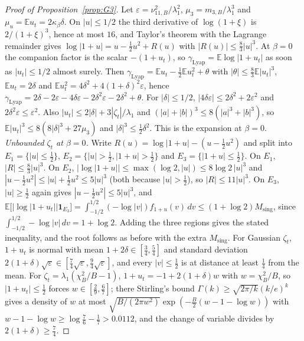 \documentclass[11pt]{article}
\theoremstyle{remark}
\newcommand{\E}{\mathbb{E}}
\begin{document}
\begin{proof}[Proof of Proposition~\ref{prop:G3}]
Let $\varepsilon=\nu_{11,B}^2/\lambda_1^2$, $\mu_3=m_{3,B}/\lambda_1^3$ and $\mu_u=\E u_t=2\kappa_\beta\delta$. On $|u|\le1/2$ the third derivative of $\log(1+\xi)$ is $2/(1+\xi)^3$, hence at most $16$, and Taylor's theorem with the Lagrange remainder gives $\log|1+u|=u-\frac12 u^2+R(u)$ with $|R(u)|\le\frac83|u|^3$. At $\beta=0$ the companion factor is the scalar $-(1+u_t)$, so $\gamma_{\mathrm{Lyap}}=\E\log|1+u_t|$ as soon as $|u_t|\le1/2$ almost surely. Then $\gamma_{\mathrm{Lyap}}=\E u_t-\frac12\E u_t^2+\theta$ with $|\theta|\le\frac83\E|u_t|^3$, $\E u_t=2\delta$ and $\E u_t^2=4\delta^2+4(1+\delta)^2\varepsilon$, hence $\gamma_{\mathrm{Lyap}}=2\delta-2\varepsilon-4\delta\varepsilon-2\delta^2\varepsilon-2\delta^2+\theta$. For $|\delta|\le1/2$, $|4\delta\varepsilon|\le2\delta^2+2\varepsilon^2$ and $2\delta^2\varepsilon\le\varepsilon^2$. Also $|u_t|\le2|\delta|+3|\zeta_t|/\lambda_1$ and $(|a|+|b|)^3\le8(|a|^3+|b|^3)$, so $\E|u_t|^3\le8(8|\delta|^3+27\mu_3)$ and $|\delta|^3\le\frac12\delta^2$. This is the expansion at $\beta=0$. \emph{Unbounded $\zeta_t$ at $\beta=0$.} Write $R(u)=\log|1+u|-(u-\frac12u^2)$ and split into $E_1=\{|u|\le\frac12\}$, $E_2=\{|u|>\frac12,|1+u|>\frac12\}$ and $E_3=\{|1+u|\le\frac12\}$. On $E_1$, $|R|\le\frac83|u|^3$. On $E_2$, $|\log|1+u||\le\max(\log2,|u|)\le8\log2\,|u|^3$ and $|u-\frac12u^2|\le|u|+\frac12u^2\le5|u|^3$ (both because $|u|>\frac12$), so $|R|\le11|u|^3$. On $E_3$, $|u|\ge\frac12$ again gives $|u-\frac12u^2|\le5|u|^3$, and $\E\big[|\log|1+u_t||\mathbf 1_{E_3}\big]=\int_{-1/2}^{1/2}(-\log|v|)f_{1+u}(v)\,dv\le(1+\log2)M_{\mathrm{sing}}$, since $\int_{-1/2}^{1/2}-\log|v|\,dv=1+\log2$. Adding the three regions gives the stated inequality, and the root follows as before with the extra $M_{\mathrm{sing}}$. For Gaussian $\zeta_t$, $1+u_t$ is normal with mean $1+2\delta\in[\frac34,\frac54]$ and standard deviation $2(1+\delta)\sqrt\varepsilon\in[\frac74\sqrt\varepsilon,\frac94\sqrt\varepsilon]$, and every $|v|\le\frac12$ is at distance at least $\frac14$ from the mean. For $\zeta_t=\lambda_1(\chi^2_B/B-1)$, $1+u_t=-1+2(1+\delta)w$ with $w=\chi^2_B/B$, so $|1+u_t|\le\frac12$ forces $w\in[\frac29,\frac67]$; there Stirling's bound $\Gamma(k)\ge\sqrt{2\pi/k}(k/e)^k$ gives a density of $w$ at most $\sqrt{B/(2\pi w^2)}\exp(-\frac B2(w-1-\log w))$ with $w-1-\log w\ge\log\frac76-\frac17>0.0112$, and the change of variable divides by $2(1+\delta)\ge\frac74$.


\end{proof}
\end{document}
